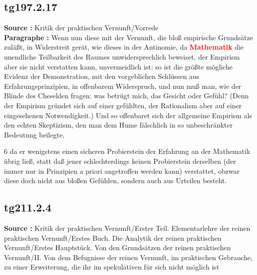 \documentclass[a4paper,12pt,twoside]{book}
\newcommand{\match}[1]{\textcolor{red}{\textbf{#1}}}
\begin{document}
	\subsection*{tg197.2.17} 
	\textbf{Source : }Kritik der praktischen Vernunft/Vorrede\\  
	
	\noindent\textbf{Paragraphe : }
	Wenn nun diese mit der Vernunft, die bloß empirische Grundsätze zuläßt, in Widerstreit gerät, wie dieses in der Antinomie, da \match{Mathematik} die unendliche Teilbarkeit des Raumes unwidersprechlich beweiset, der Empirism aber sie nicht verstatten kann, unvermeidlich ist: so ist die größte mögliche Evidenz der Demonstration, mit den vorgeblichen Schlüssen aus Erfahrungsprinzipien, in offenbarem Widerspruch, und nun muß man, wie der Blinde des Cheselden fragen: was betrügt mich, das Gesicht oder Gefühl? (Denn der Empirism gründet sich auf einer gefühlten, der Rationalism aber auf einer eingesehenen Notwendigkeit.) Und so offenbaret sich der allgemeine Empirism als den echten Skeptizism, den man dem Hume fälschlich in so unbeschränkter Bedeutung beilegte,
	
	
	6
	da er wenigstens einen sicheren Probierstein der Erfahrung an der Mathematik übrig ließ, statt daß jener schlechterdings keinen Probierstein derselben (der immer nur in Prinzipien a priori angetroffen werden kann) verstattet, obzwar diese doch nicht aus bloßen Gefühlen, sondern auch aus Urteilen besteht. 
	
	\subsection*{tg211.2.4} 
	\textbf{Source : }Kritik der praktischen Vernunft/Erster Teil. Elementarlehre der reinen praktischen Vernunft/Erstes Buch. Die Analytik der reinen praktischen Vernunft/Erstes Hauptstück. Von den Grundsätzen der reinen praktischen Vernunft/II. Von dem Befugnisse der reinen Vernunft, im praktischen Gebrauche, zu einer Erweiterung, die ihr im spekulativen für sich nicht möglich ist\\  
	
\end{document}
